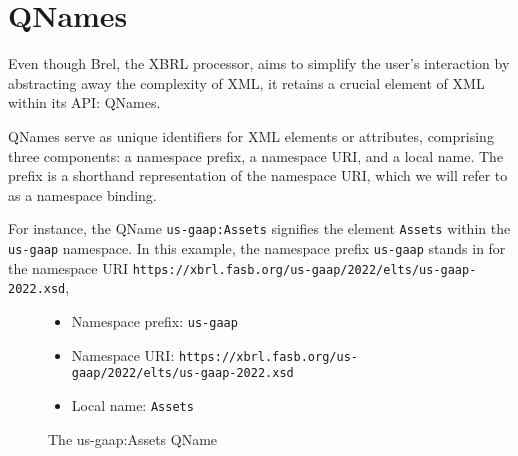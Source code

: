 \section{QNames}
\label{sec:qnames}





Even though Brel, the XBRL processor, aims to simplify the user's interaction by abstracting away the complexity of XML,
it retains a crucial element of XML within its API: QNames.

QNames serve as unique identifiers for XML elements or attributes,
comprising three components: a namespace prefix, a namespace URI, and a local name.
The prefix is a shorthand representation of the namespace URI, which we will refer to as a namespace binding.

For instance, the QName \texttt{us-gaap:Assets} signifies the element \texttt{Assets} within the \texttt{us-gaap} namespace.
In this example, the namespace prefix \texttt{us-gaap} stands in for the namespace URI \texttt{https://xbrl.fasb.org/us-gaap/2022/elts/us-gaap-2022.xsd},

\begin{figure}[H]
    \caption{The us-gaap:Assets QName}
    \label{fig:qname_us_gaap_assets}
    \begin{itemize}
        \item Namespace prefix: \texttt{us-gaap}
        \item Namespace URI: \texttt{https://xbrl.fasb.org/us-gaap/2022/elts/us-gaap-2022.xsd}
        \item Local name: \texttt{Assets}
    \end{itemize}
\end{figure}

